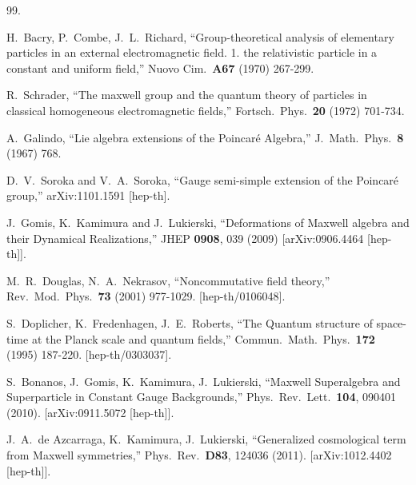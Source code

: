 \documentclass [prd,reprint,eqsecnum,nofootinbib]  {revtex4-1}
\begin{document}
\begin{thebibliography}{99.}

  H.~Bacry, P.~Combe, J.~L.~Richard,
  ``Group-theoretical analysis of elementary particles in an external electromagnetic field. 1.
  the relativistic particle in a constant and uniform field,''
  Nuovo Cim.\  {\bf A67 } (1970)  267-299.

  R.~Schrader,
  ``The maxwell group and the quantum theory of particles in classical homogeneous electromagnetic fields,''
  Fortsch.\ Phys.\  {\bf 20 } (1972)  701-734.

  A.~Galindo,
  ``Lie algebra extensions of the Poincar\'e Algebra,''
  J.\ Math.\ Phys.\  {\bf 8 } (1967)  768.

  D.~V.~Soroka and V.~A.~Soroka,
  ``Gauge semi-simple extension of the Poincar\'e group,''
  arXiv:1101.1591 [hep-th].

  J.~Gomis, K.~Kamimura and J.~Lukierski,
  ``Deformations of Maxwell algebra and their Dynamical Realizations,''
  JHEP {\bf 0908}, 039 (2009)
  [arXiv:0906.4464 [hep-th]].

  M.~R.~Douglas, N.~A.~Nekrasov,
  ``Noncommutative field theory,''
  Rev.\ Mod.\ Phys.\  {\bf 73 } (2001)  977-1029.
  [hep-th/0106048].

  S.~Doplicher, K.~Fredenhagen, J.~E.~Roberts,
  ``The Quantum structure of space-time at the Planck scale and quantum fields,''
  Commun.\ Math.\ Phys.\  {\bf 172 } (1995)  187-220.
  [hep-th/0303037].

  S.~Bonanos, J.~Gomis, K.~Kamimura, J.~Lukierski,
 ``Maxwell Superalgebra and Superparticle in Constant Gauge Backgrounds,''
  Phys.\ Rev.\ Lett.\  {\bf 104}, 090401 (2010).
  [arXiv:0911.5072 [hep-th]].

  J.~A.~de Azcarraga, K.~Kamimura, J.~Lukierski,
  ``Generalized cosmological term from Maxwell symmetries,''
  Phys.\ Rev.\  {\bf D83}, 124036 (2011).
  [arXiv:1012.4402 [hep-th]].







\end{thebibliography}
\end{document}
